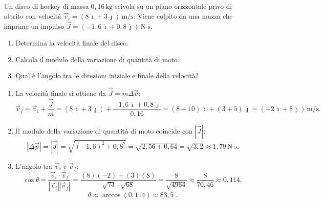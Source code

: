 \begin{question}[ID=1.2, subtitle={Impulso vettoriale su un disco di hockey}, tags={quantità di moto, impulso, variazione vettoriale}, difficulty=media]
Un disco di hockey di massa \(0{,}16 \, \text{kg}\) scivola su un piano orizzontale privo di attrito con velocità \(\vec{v}_i = (8\,\hat{\imath} + 3\,\hat{\jmath}) \, \text{m/s}\).
Viene colpito da una mazza che imprime un impulso \(\vec{J} = (-1{,}6\,\hat{\imath} + 0{,}8\,\hat{\jmath}) \, \text{N·s}\).
\begin{enumerate}
    \item Determina la velocità finale del disco.
    \item Calcola il modulo della variazione di quantità di moto.
    \item Qual è l'angolo tra le direzioni iniziale e finale della velocità?
\end{enumerate}
\begin{solution}
    \begin{enumerate}
        \item La velocità finale si ottiene da \(\vec{J} = m\Delta\vec{v}\):
        \[
            \vec{v}_f = \vec{v}_i + \frac{\vec{J}}{m}
            = (8\,\hat{\imath}+3\,\hat{\jmath}) + \frac{-1{,}6\,\hat{\imath}+0{,}8\,\hat{\jmath}}{0{,}16}
            = (8-10)\,\hat{\imath} + (3+5)\,\hat{\jmath}
            = (-2\,\hat{\imath} + 8\,\hat{\jmath}) \, \text{m/s}.
        \]
        \item Il modulo della variazione di quantità di moto coincide con \(|\vec{J}|\):
        \[
            |\Delta\vec{p}| = |\vec{J}| = \sqrt{(-1{,}6)^2 + 0{,}8^2} = \sqrt{2{,}56 + 0{,}64} = \sqrt{3{,}2} \approx 1{,}79 \, \text{N·s}.
        \]
        \item L'angolo tra \(\vec{v}_i\) e \(\vec{v}_f\):
        \[
            \cos\theta = \frac{\vec{v}_i \cdot \vec{v}_f}{|\vec{v}_i||\vec{v}_f|}
            = \frac{(8)(-2)+(3)(8)}{\sqrt{73}\cdot\sqrt{68}}
            = \frac{8}{\sqrt{4964}} \approx \frac{8}{70{,}46} \approx 0{,}114,
        \]
        \[
            \theta \approx \arccos(0{,}114) \approx 83{,}5^\circ.
        \]
    \end{enumerate}
\end{solution}
\end{question}


